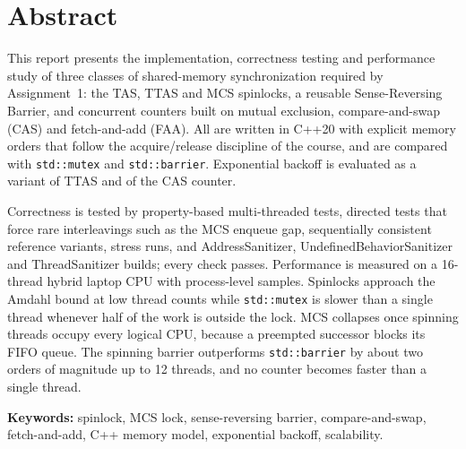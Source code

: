 \section*{Abstract}

This report presents the implementation, correctness testing and performance study of three classes of shared-memory synchronization required by Assignment~1: the TAS, TTAS and MCS spinlocks, a reusable Sense-Reversing Barrier, and concurrent counters built on mutual exclusion, compare-and-swap (CAS) and fetch-and-add (FAA). All are written in C++20 with explicit memory orders that follow the acquire/release discipline of the course, and are compared with \texttt{std::mutex} and \texttt{std::barrier}. Exponential backoff is evaluated as a variant of TTAS and of the CAS counter.

Correctness is tested by property-based multi-threaded tests, directed tests that force rare interleavings such as the MCS enqueue gap, sequentially consistent reference variants, stress runs, and AddressSanitizer, UndefinedBehaviorSanitizer and ThreadSanitizer builds; every check passes. Performance is measured on a 16-thread hybrid laptop CPU with \NumSamples{} process-level samples. Spinlocks approach the Amdahl bound at low thread counts while \texttt{std::mutex} is slower than a single thread whenever half of the work is outside the lock. MCS collapses once spinning threads occupy every logical CPU, because a preempted successor blocks its FIFO queue. The spinning barrier outperforms \texttt{std::barrier} by about two orders of magnitude up to 12 threads, and no counter becomes faster than a single thread.

\textbf{Keywords:} spinlock, MCS lock, sense-reversing barrier, compare-and-swap, fetch-and-add, C++ memory model, exponential backoff, scalability.
